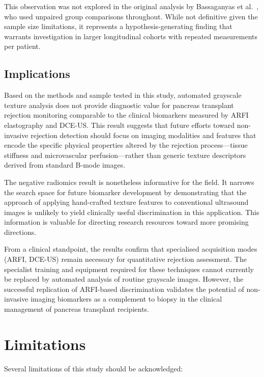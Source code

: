 This observation was not explored in the original analysis by Bassaganyas et al.\ \cite{bassaganyas2025}, who used unpaired group comparisons throughout. While not definitive given the sample size limitations, it represents a hypothesis-generating finding that warrants investigation in larger longitudinal cohorts with repeated measurements per patient.

\subsection{Implications}

Based on the methods and sample tested in this study, automated grayscale texture analysis does not provide diagnostic value for pancreas transplant rejection monitoring comparable to the clinical biomarkers measured by ARFI elastography and DCE-US. This result suggests that future efforts toward non-invasive rejection detection should focus on imaging modalities and features that encode the specific physical properties altered by the rejection process---tissue stiffness and microvascular perfusion---rather than generic texture descriptors derived from standard B-mode images.

The negative radiomics result is nonetheless informative for the field. It narrows the search space for future biomarker development by demonstrating that the approach of applying hand-crafted texture features to conventional ultrasound images is unlikely to yield clinically useful discrimination in this application. This information is valuable for directing research resources toward more promising directions.

From a clinical standpoint, the results confirm that specialised acquisition modes (ARFI, DCE-US) remain necessary for quantitative rejection assessment. The specialist training and equipment required for these techniques cannot currently be replaced by automated analysis of routine grayscale images. However, the successful replication of ARFI-based discrimination validates the potential of non-invasive imaging biomarkers as a complement to biopsy in the clinical management of pancreas transplant recipients.


\section{Limitations}
\label{sec:limitations}

Several limitations of this study should be acknowledged:

